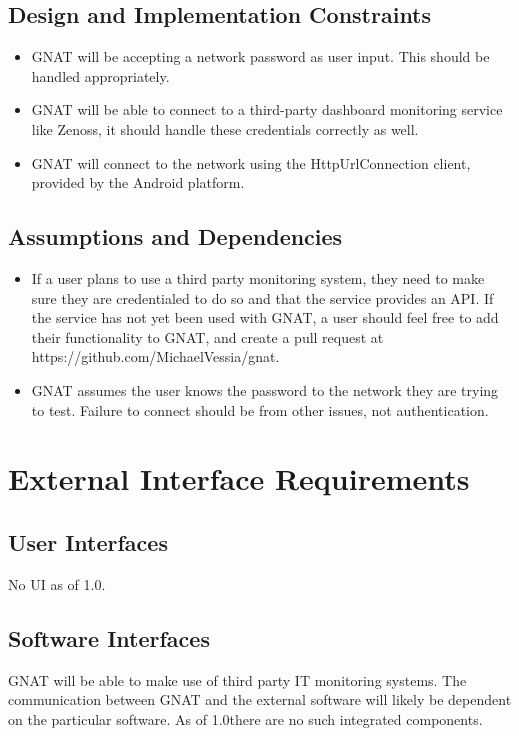 \documentclass{scrreprt}
\def\version{1.0}
\def\sourcecode{https://github.com/MichaelVessia/gnat}
\begin{document}
\section{Design and Implementation Constraints}

\begin{itemize}
  \item GNAT will be accepting a network password as user input.  This should be handled appropriately.
  \item GNAT will be able to connect to a third-party dashboard monitoring service like Zenoss, it should handle these credentials correctly as well.
  \item GNAT will connect to the network using the HttpUrlConnection client, provided by the Android platform.
\end{itemize}

\section{Assumptions and Dependencies}

\begin{itemize}
  \item If a user plans to use a third party monitoring system, they need to make sure they are credentialed to do so and that the service provides an API.  If the service has not yet been used with GNAT, a user should feel free to add their functionality to GNAT, and create a pull request at \sourcecode.
  \item GNAT assumes the user knows the password to the network they are trying to test.  Failure to connect should be from other issues, not authentication.
\end{itemize}

\chapter{External Interface Requirements}

\section{User Interfaces}

No UI as of \version.

\section{Software Interfaces}
GNAT will be able to make use of third party IT monitoring systems.  The communication between GNAT and the external software will likely be dependent on the particular software.  As of \version there are no such integrated components.
\end{document}
